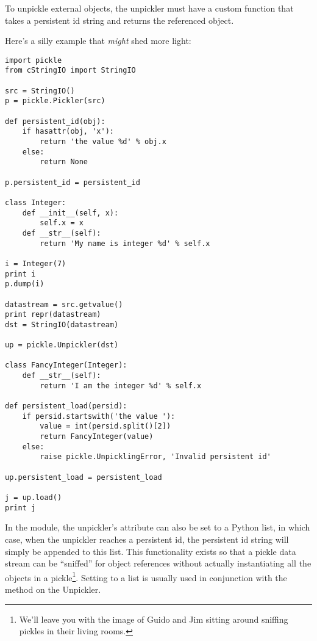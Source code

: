 To unpickle external objects, the unpickler must have a custom
 function that takes a persistent id
string and returns the referenced object.

Here's a silly example that \emph{might} shed more light:

\begin{verbatim}
import pickle
from cStringIO import StringIO

src = StringIO()
p = pickle.Pickler(src)

def persistent_id(obj):
    if hasattr(obj, 'x'):
        return 'the value %d' % obj.x
    else:
        return None

p.persistent_id = persistent_id

class Integer:
    def __init__(self, x):
        self.x = x
    def __str__(self):
        return 'My name is integer %d' % self.x

i = Integer(7)
print i
p.dump(i)

datastream = src.getvalue()
print repr(datastream)
dst = StringIO(datastream)

up = pickle.Unpickler(dst)

class FancyInteger(Integer):
    def __str__(self):
        return 'I am the integer %d' % self.x

def persistent_load(persid):
    if persid.startswith('the value '):
        value = int(persid.split()[2])
        return FancyInteger(value)
    else:
        raise pickle.UnpicklingError, 'Invalid persistent id'

up.persistent_load = persistent_load

j = up.load()
print j
\end{verbatim}

In the  module, the unpickler's
 attribute can also be set to a Python
list, in which case, when the unpickler reaches a persistent id, the
persistent id string will simply be appended to this list.  This
functionality exists so that a pickle data stream can be ``sniffed''
for object references without actually instantiating all the objects
in a pickle\footnote{We'll leave you with the image of Guido and Jim
sitting around sniffing pickles in their living rooms.}.  Setting
 to a list is usually used in conjunction with
the  method on the Unpickler.


